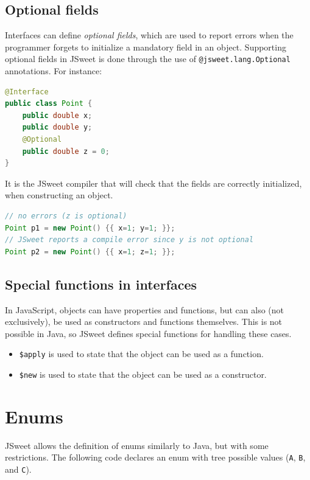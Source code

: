 \documentclass[a4paper]{report}
\begin{document}
\subsection{Optional fields}
 
Interfaces can define \emph{optional fields}, which are used to report errors when the programmer forgets to initialize a mandatory field in an object. Supporting optional fields in JSweet is done through the use of \texttt{@jsweet.lang.Optional} annotations. For instance:

\begin{lstlisting}[language=Java]
@Interface
public class Point {
	public double x;
	public double y;
	@Optional
	public double z = 0;
}
\end{lstlisting}

It is the JSweet compiler that will check that the fields are correctly initialized, when constructing an object.

\begin{lstlisting}[language=Java]
// no errors (z is optional)
Point p1 = new Point() {{ x=1; y=1; }};
// JSweet reports a compile error since y is not optional
Point p2 = new Point() {{ x=1; z=1; }};
\end{lstlisting}

\subsection{Special functions in interfaces}

In JavaScript, objects can have properties and functions, but can also (not exclusively), be used as constructors and functions themselves. This is not possible in Java, so JSweet defines special functions for handling these cases.

\begin{itemize}
\item \texttt{\$apply} is used to state that the object can be used as a function.
\item \texttt{\$new} is used to state that the object can be used as a constructor.
\end{itemize}

\section{Enums} 

JSweet allows the definition of enums similarly to Java, but with some restrictions. The following code declares an enum with tree possible values (\texttt{A}, \texttt{B}, and \texttt{C}).
\end{document}
